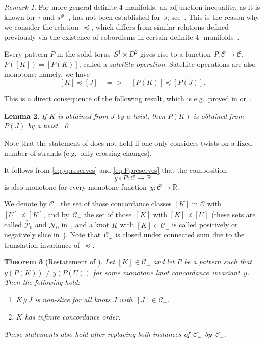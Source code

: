 \documentclass{amsart}
\let\cref\Cref
\newcommand{\R}{\mathbb{R}}
\newcommand{\CC}{\mathcal{C}}
\newtheorem{theorem}{Theorem}%
\newtheorem{lemma}[theorem]{Lemma}
\theoremstyle{remark}
\newtheorem{remark}[theorem]{Remark}
\def\Rightarrow{=>}
\begin{document}
\begin{remark}
For more general definite $4$-manifolds, an adjunction inequality, as it is known for $\tau$ and $s^{\#}$~\cite{zbMATH02057402,zbMATH06272212}, has not been established for~$s$; see~\cite[Question~9.7]{manolescu-marengon-sarkar-willis}. This is the reason why we consider the relation~$\preceq$, which differs from similar relations defined previously via the existence of cobordisms in certain definite $4$-%
manifolds~\cite{zbMATH04096384,zbMATH06198082}.
\end{remark}

Every pattern $P$ in the solid torus~$S^1 \times D^2$ gives rise to a function $P\colon\CC \to\CC$, $P([K]) = [P(K)]$, called a \emph{satellite operation}. Satellite operations are also monotone; namely, we have
\begin{equation}\label{eq:Ppreserves}
[K] \preceq [J] \quad \Rightarrow \quad
[P(K)] \preceq [P(J)].
\end{equation}

This is a direct consequence of the following result, which is e.g.~proved in \cite[Lemma~4.1]{zbMATH07442350} or~\cite[Lemma~4.7]{zbMATH07939044}.

\begin{lemma}\label{lem:monotonesattelite}
If $K$ is obtained from $J$ by a twist, then $P(K)$ is obtained from~$P(J)$ by a twist. \qed
\end{lemma}

Note that the statement of \cref{lem:monotonesattelite} does not hold if one only considers twists on a fixed number of strands (e.g.~only crossing changes).

It follows from \eqref{eq:ypreserves} and \eqref{eq:Ppreserves} that the composition $$y\circ P\colon\CC \to \mathbb{R}$$ is also monotone for every monotone function~$y \colon \CC \to \R$.

We denote by $\CC_+$ the set of those concordance classes $[K]$ in $\CC$ with~$[U] \preceq [K]$, and by~$\CC_-$ the set of those~$[K]$ with $[K] \preceq [U]$
(these sets are called $\widetilde{\mathcal P_0}$ and $\widetilde{\mathcal N_0}$ in~\cite{zbMATH06339370},
and a knot $K$ with $[K]\in\CC_{\pm}$ is called positively or negatively slice in~\cite{zbMATH07880416}). Note that~$\CC_{\pm}$ is closed under connected sum due to the translation-invariance of~$\preceq$.

\begin{theorem}[{Restatement of }]\label{thm:main_detailed}
Let $[K]\in \CC_+$ and let $P$ be a pattern such that
$y(P(K)) \neq y(P(U))$ for some monotone knot concordance invariant~$y$. Then the following hold:
\begin{enumerate}[label=(\alph*)]
\item $K \# J$ is non-slice for all knots $J$ with~$[J]\in \CC_+$. \label{item:KJ_non-slice}
\item $K$ has infinite concordance order. \label{item:inf_order}
\end{enumerate}
These statements also hold after replacing both instances of~$\CC_+$ by~$\CC_-$. 
\end{theorem}
\end{document}
